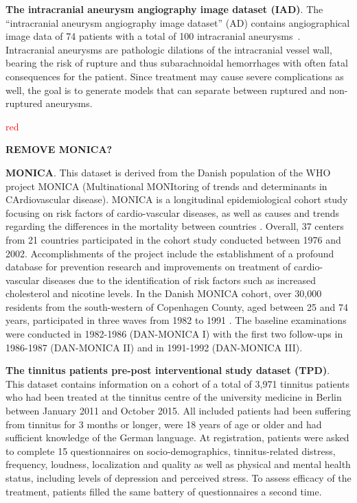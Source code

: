\documentclass[
]{book}
\begin{document}
\textbf{The intracranial aneurysm angiography image dataset (IAD)}. The ``intracranial aneurysm angiography image dataset'' (AD) contains angiographical image data of 74 patients with a total of 100 intracranial aneurysms~\autocite{Niemann:CBMS2018}.
Intracranial aneurysms are pathologic dilations of the intracranial vessel wall, bearing the risk of rupture and thus subarachnoidal hemorrhages with often fatal consequences for the patient.
Since treatment may cause severe complications as well, the goal is to generate models that can separate between ruptured and non-ruptured aneurysms.

\textcolor{red}{red}

\textbf{REMOVE MONICA?}

\textbf{MONICA}. This dataset is derived from the Danish population of the WHO project MONICA (Multinational MONItoring of trends and determinants in CArdiovascular disease).
MONICA is a longitudinal epidemiological cohort study focusing on risk factors of cardio-vascular diseases, as well as causes and trends regarding the differences in the mortality between countries \autocite{WHO:MONICA1989}.
Overall, 37 centers from 21 countries participated in the cohort study conducted between 1976 and 2002.
Accomplishments of the project include the establishment of a profound database for prevention research and improvements on treatment of cardio-vascular diseases due to the identification of risk factors such as increased cholesterol and nicotine levels.
In the Danish MONICA cohort, over 30,000 residents from the south-western of Copenhagen County, aged between 25 and 74 years, participated in three waves from 1982 to 1991 \autocite{Bronnum:DanMONICA2001}.
The baseline examinations were conducted in 1982-1986 (DAN-MONICA I) with the first two follow-ups in 1986-1987 (DAN-MONICA II) and in 1991-1992 (DAN-MONICA III).

\textbf{The tinnitus patients pre-post interventional study dataset (TPD)}. This dataset contains information on a cohort of a total of 3,971 tinnitus patients who had been treated at the tinnitus centre of the university medicine in Berlin between January 2011 and October 2015. All included patients had been suffering from tinnitus for 3 months or longer, were 18 years of age or older and had sufficient knowledge of the German language.
At registration, patients were asked to complete 15 questionnaires on socio-demographics, tinnitus-related distress, frequency, loudness, localization and quality as well as physical and mental health status, including levels of depression and perceived stress.
To assess efficacy of the treatment, patients filled the same battery of questionnaires a second time.
\end{document}
